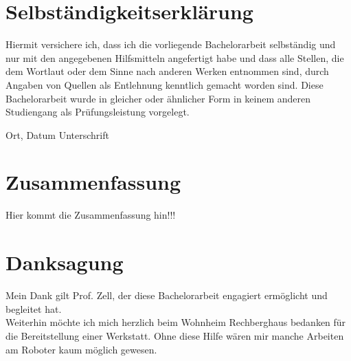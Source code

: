 \documentclass[twoside,12pt,a4paper]{report}
\begin{document}
	\section*{Selbst\"andigkeitserkl\"arung}
	
	Hiermit versichere ich, dass ich die vorliegende Bachelorarbeit 
	selbst\"andig und nur mit den angegebenen Hilfsmitteln angefertigt habe und dass alle Stellen, die dem Wortlaut oder dem 
	Sinne nach anderen Werken entnommen sind, durch Angaben von Quellen als 
	Entlehnung kenntlich gemacht worden sind. 
	Diese Bachelorarbeit wurde in gleicher oder \"ahnlicher Form in keinem anderen 
	Studiengang als Pr\"ufungsleistung vorgelegt. 
	
	\vskip 3cm
	
	Ort, Datum	\hfill Unterschrift \hfill 
	\newpage
	
	
	\setcounter{page}{1}
	
	
	
	\section*{Zusammenfassung}
	
	Hier kommt die Zusammenfassung hin!!!
	
	\newpage
	
	\section*{Danksagung}
	Mein Dank gilt Prof. Zell, der diese Bachelorarbeit engagiert ermöglicht und begleitet hat. \\
	Weiterhin möchte ich mich herzlich beim Wohnheim Rechberghaus bedanken für die Bereitstellung einer Werkstatt. Ohne diese Hilfe wären mir manche Arbeiten am Roboter kaum möglich gewesen. 
	\cleardoublepage
	
	
	\renewcommand{\baselinestretch}{1.3}
	\small\normalsize
	
	\tableofcontents
	
\end{document}
